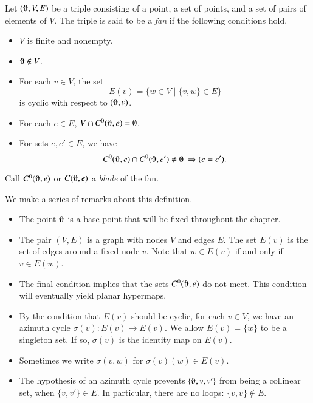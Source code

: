 \begin{definition}[fan]  Let $(\orgn,V,E)$ be a triple consisting of a point,
a set of
points, and a set of pairs of elements of $V$.  The triple is said to be
a {\it fan\/} if the following conditions hold.
    \begin{itemize}
    \item $V$ is finite and nonempty.
    \item $\orgn\not\in V$.
    \item For each $v\in V$, the set
        $$
        E(v) = \{w\in V\mid \{v,w\}\in E\}
        $$
        is cyclic with respect to $(\orgn,v)$.
    \item For each $e\in E$, $V\cap C^0(\orgn,e)=\emptyset$.
    \item For sets $e,e'\in E$,   we have
        $$C^0(\orgn,e) \cap C^0(\orgn,e')\ne\emptyset\ \Rightarrow (e = e').$$
    \end{itemize}
Call $C^0(\orgn,e)$ or $C(\orgn,e)$ a {\it blade\/} of the fan.
\end{definition}

We make a series of remarks about this definition.

\begin{remark}
\begin{itemize}
\item The point $\orgn$ is a base point that will be fixed throughout
the chapter.  
\item The pair $(V,E)$ is a graph with nodes $V$ and edges $E$.  The set
$E(v)$ is the set of edges around a fixed node $v$.
Note that $w\in E(v)$ if and only if $v\in E(w)$.   
%
\item The final condition implies that the sets $C^0(\orgn,e)$
do not meet.   This condition will eventually yield planar
hypermaps.
%
\item
By the condition that $E(v)$ should be cyclic,
for each $v\in V$, we have an azimuth cycle $\sigma(v):E(v)\to E(v)$.
We allow $E(v) = \{w\}$ to be a
singleton set. If so,
$\sigma(v)$ is the identity map on $E(v)$.
%
\item
Sometimes we write $\sigma(v,w)$ for $\sigma(v)(w)\in E(v)$.
%
\item 
The hypothesis of an azimuth cycle
prevents $\{\orgn,v,v'\}$ from being a collinear set, when $\{v,v'\}\in
E$.  In particular, there are no loops: $\{v,v\}\not\in E$.
%
\end{itemize}
\end{remark}



